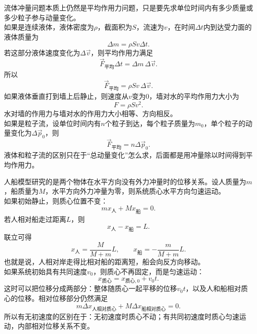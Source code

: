 \begin{casetypebox}[title={\strut\textcolor{white}{\bfseries 常见题型：流体问题}}]
流体冲量问题本质上仍然是平均作用力问题，只是要先求单位时间内有多少质量或多少粒子参与动量变化。\\
如果是连续液体，液体密度为$\rho$，截面积为$S$，流速为$v$，在时间$\Delta t$内到达受力面的液体质量为
\[
  \Delta m=\rho Sv\Delta t.
\]
若这部分液体速度变化为$\Delta\vec v$，则平均作用力满足
\[
  \vec F_{\text{平均}}\Delta t=\Delta m\,\Delta\vec v.
\]
所以
\[
  \vec F_{\text{平均}}=\rho Sv\,\Delta\vec v.
\]
如果液体垂直打到墙上后静止，则速度从$v$变为0，墙对水的平均作用力大小为
\[
  F=\rho Sv^2.
\]
水对墙的作用力与墙对水的作用力大小相等、方向相反。\\
如果是粒子流，设单位时间内有$n$个粒子到达，每个粒子质量为$m_0$，单个粒子的动量变化为$\Delta\vec p_0$，则
\[
  \vec F_{\text{平均}}=n\Delta\vec p_0.
\]
液体和粒子流的区别只在于“总动量变化”怎么求，后面都是用冲量除以时间得到平均作用力。
\end{casetypebox}

\begin{casetypebox}[title={\strut\textcolor{white}{\bfseries 常见题型：人船模型}}]
人船模型研究的是两个物体在水平方向没有外力冲量时的位移关系。设人质量为$m$，船质量为$M$，水平方向外力冲量为零，则系统质心水平方向匀速运动。\\
如果初始静止，则质心位置不变：
\[
  mx_{\text{人}}+Mx_{\text{船}}=0.
\]
若人相对船走过距离$L$，则
\[
  x_{\text{人}}-x_{\text{船}}=L.
\]
联立可得
\[
  x_{\text{人}}=\frac{M}{M+m}L,\qquad
  x_{\text{船}}=-\frac{m}{M+m}L.
\]
也就是说，人相对岸走得比相对船的距离短，船会向反方向移动。\\
如果系统初始具有共同速度$v_0$，则质心不再固定，而是匀速运动：
\[
  x_{\text{质心}}=x_{\text{质心},0}+v_0t.
\]
这时可以把位移分成两部分：整体随质心一起平移的位移$v_0t$，以及人和船相对质心的位移。相对位移部分仍然满足
\[
  m\Delta x_{\text{人相对质心}}+M\Delta x_{\text{船相对质心}}=0.
\]
所以有无初速度的区别在于：无初速度时质心不动；有共同初速度时质心匀速运动，内部相对位移关系不变。
\end{casetypebox}

